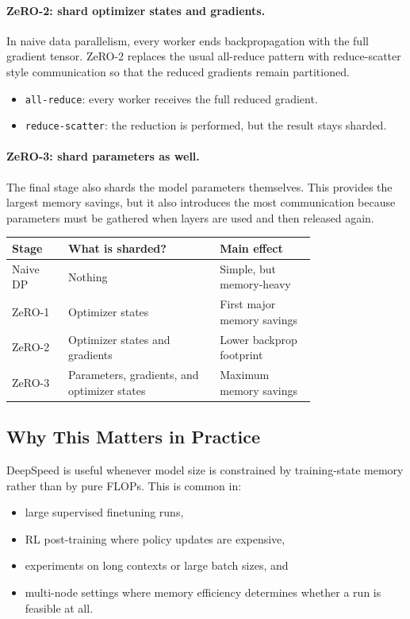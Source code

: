 \documentclass[class=article,crop=false]{standalone}
\begin{document}
\paragraph{ZeRO-2: shard optimizer states and gradients.}
In naive data parallelism, every worker ends backpropagation with the full gradient tensor. ZeRO-2 replaces the usual all-reduce pattern with reduce-scatter style communication so that the reduced gradients remain partitioned.
\begin{itemize}
  \item \texttt{all-reduce}: every worker receives the full reduced gradient.
  \item \texttt{reduce-scatter}: the reduction is performed, but the result stays sharded.
\end{itemize}

\paragraph{ZeRO-3: shard parameters as well.}
The final stage also shards the model parameters themselves. This provides the largest memory savings, but it also introduces the most communication because parameters must be gathered when layers are used and then released again.

\begin{center}
\small
\begin{tabular}{p{0.14\linewidth} p{0.38\linewidth} p{0.24\linewidth}}
\toprule
Stage & What is sharded? & Main effect \\
\midrule
Naive DP & Nothing & Simple, but memory-heavy \\
ZeRO-1 & Optimizer states & First major memory savings \\
ZeRO-2 & Optimizer states and gradients & Lower backprop footprint \\
ZeRO-3 & Parameters, gradients, and optimizer states & Maximum memory savings \\
\bottomrule
\end{tabular}
\end{center}

\subsection{Why This Matters in Practice}
\label{sec:deepspeed:practice}

DeepSpeed is useful whenever model size is constrained by training-state memory rather than by pure FLOPs. This is common in:
\begin{itemize}
  \item large supervised finetuning runs,
  \item RL post-training where policy updates are expensive,
  \item experiments on long contexts or large batch sizes, and
  \item multi-node settings where memory efficiency determines whether a run is feasible at all.
\end{itemize}
\end{document}
